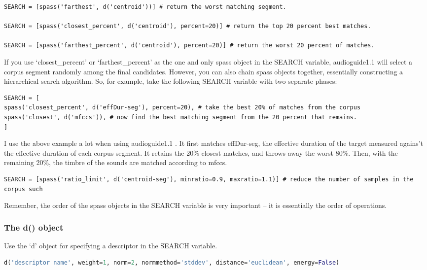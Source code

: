 \documentclass{article}
\newcommand{\ag}{audioguide1.1 }
\begin{document}
\begin{spacing}{1.2}
\begin{lstlisting}
SEARCH = [spass('farthest', d('centroid'))] # return the worst matching segment.

SEARCH = [spass('closest_percent', d('centroid'), percent=20)] # return the top 20 percent best matches.

SEARCH = [spass('farthest_percent', d('centroid'), percent=20)] # return the worst 20 percent of matches.
\end{lstlisting}

If you use `closest\_percent' or `farthest\_percent' as the one and only spass object in the SEARCH variable, \ag will select a corpus segment randomly among the final candidates.  However, you can also chain spass objects together, essentially constructing a hierarchical search algorithm.  So, for example, take the following SEARCH variable with two separate phases:

\begin{lstlisting}
SEARCH = [
spass('closest_percent', d('effDur-seg'), percent=20), # take the best 20% of matches from the corpus
spass('closest', d('mfccs')), # now find the best matching segment from the 20 percent that remains.
] 
\end{lstlisting}

I use the above example a lot when using \ag.  It first matches effDur-seg, the effective duration of the target measured agains't the effective duration of each corpus segment.  It retains the 20\% closest matches, and throws away the worst 80\%.  Then, with the remaining 20\%, the timbre of the sounds are matched according to mfccs.

\begin{lstlisting}
SEARCH = [spass('ratio_limit', d('centroid-seg'), minratio=0.9, maxratio=1.1)] # reduce the number of samples in the corpus such 
\end{lstlisting}

Remember, the order of the spass objects in the SEARCH variable is very important -- it is essentially the order of operations.

\subsubsection{The d() object}
Use the `d' object for specifying a descriptor in the SEARCH variable.

 \begin{lstlisting}[language=python]
d('descriptor name', weight=1, norm=2, normmethod='stddev', distance='euclidean', energy=False)
\end{lstlisting}
 

\end{spacing}
\end{document}
